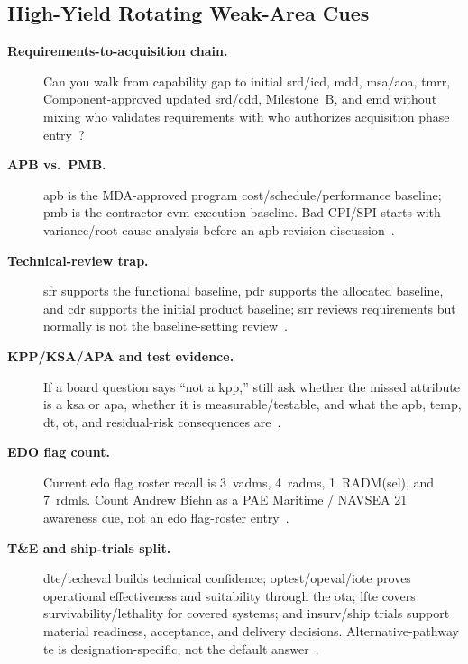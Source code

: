 \documentclass[../main.tex]{subfiles}
\begin{document}
\subsection{High-Yield Rotating Weak-Area Cues}
\begin{description}
  \item[\textbf{Requirements-to-acquisition chain.}] Can you walk from capability gap to initial \ac{srd}/\ac{icd}, \ac{mdd}, \ac{msa}/\ac{aoa}, \ac{tmrr}, Component-approved updated \ac{srd}/\ac{cdd}, Milestone~B, and \ac{emd} without mixing who validates requirements with who authorizes acquisition phase entry~\autocite{CJCSM5123-01,DoDI5000-85,edo-3-3-2-acq-milestones-phases-2025,edo-3-3-3-jfrp-2026}?
  \item[\textbf{APB vs.\ PMB.}] \ac{apb} is the MDA-approved program cost/schedule/performance baseline; \ac{pmb} is the contractor \ac{evm} execution baseline. Bad CPI/SPI starts with variance/root-cause analysis before an \ac{apb} revision discussion~\autocite{DoDI5000-85,edo-3-6-1-evm-intro-2025,edo-3-6-2-evm-analysis-2025}.
  \item[\textbf{Technical-review trap.}] \ac{sfr} supports the functional baseline, \ac{pdr} supports the allocated baseline, and \ac{cdr} supports the initial product baseline; \ac{srr} reviews requirements but normally is not the baseline-setting review~\autocite{DoDI5000-88,DAU-Technical-Baselines,DAU-System-Requirements-Review,DAU-System-Functional-Review,DAU-Preliminary-Design-Review,DAU-Critical-Design-Review}.
  \item[\textbf{KPP/KSA/APA and test evidence.}] If a board question says ``not a \ac{kpp},'' still ask whether the missed attribute is a \ac{ksa} or \ac{apa}, whether it is measurable/testable, and what the \ac{apb}, \ac{temp}, \ac{dt}, \ac{ot}, and residual-risk consequences are~\autocite{CJCSM5123-01,DoDI5000-85,edo-3-3-3-jfrp-2026}.
  \item[\textbf{EDO flag count.}] Current \ac{edo} flag roster recall is 3~\acp{vadm}, 4~\acp{radm}, 1~RADM(sel), and 7~\acp{rdml}. Count Andrew Biehn as a PAE Maritime / NAVSEA 21 awareness cue, not an \ac{edo} flag-roster entry~\autocite{navy-flag-roster-2026-06,PAE-Maritime-Homepage-2026}.
  \item[\textbf{T\&E and ship-trials split.}] \ac{dte}/\ac{techeval} builds technical confidence; \ac{optest}/\ac{opeval}/\ac{iote} proves operational effectiveness and suitability through the \ac{ota}; \ac{lfte} covers survivability/lethality for covered systems; and \ac{insurv}/ship trials support material readiness, acceptance, and delivery decisions. Alternative-pathway \ac{te} is designation-specific, not the default answer~\autocite{USC-10-4171,USC-10-4172,USC-10-8674,DoDI5000-98,OPNAVINST-4700-8M}.

\end{description}
\end{document}
